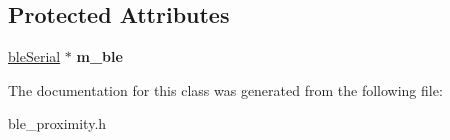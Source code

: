 \subsection*{Protected Attributes}
\begin{DoxyCompactItemize}
\item 
\hypertarget{classble_proximity_a23f150c7262e6b8b099208262a505117}{\hyperlink{classble_serial}{ble\-Serial} $\ast$ {\bfseries m\-\_\-ble}}\label{classble_proximity_a23f150c7262e6b8b099208262a505117}

\end{DoxyCompactItemize}


The documentation for this class was generated from the following file\-:\begin{DoxyCompactItemize}
\item 
ble\-\_\-proximity.\-h\end{DoxyCompactItemize}
